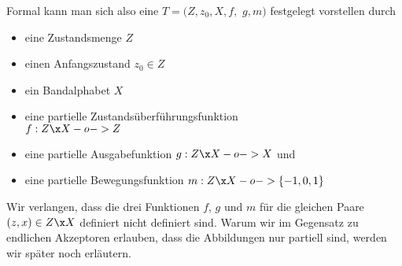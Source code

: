 Formal kann man sich also eine
 $T=(Z,z_0,X,f,$ $g,m)$
festgelegt vorstellen durch
\begin{itemize}
\item eine Zustandsmenge $Z$
\item einen Anfangszustand $z_0\in Z$
\item ein Bandalphabet $X$
\item eine partielle Zustandsüberführungsfunktion \\
  $f:Z\x X-o->Z$
\item eine partielle Ausgabefunktion $g:Z\x X-o-> X$ und
\item eine partielle Bewegungsfunktion $m:Z\x X -o-> \{ -1, 0, 1\}$
\end{itemize}
%
Wir verlangen, dass die drei Funktionen $f$, $g$ und $m$ für die
gleichen Paare $(z,x)\in Z\x X$ definiert \bzw nicht definiert sind.
Warum wir im Gegensatz zu \zB endlichen Akzeptoren erlauben, dass die
Abbildungen nur partiell sind, werden wir später noch erläutern.


